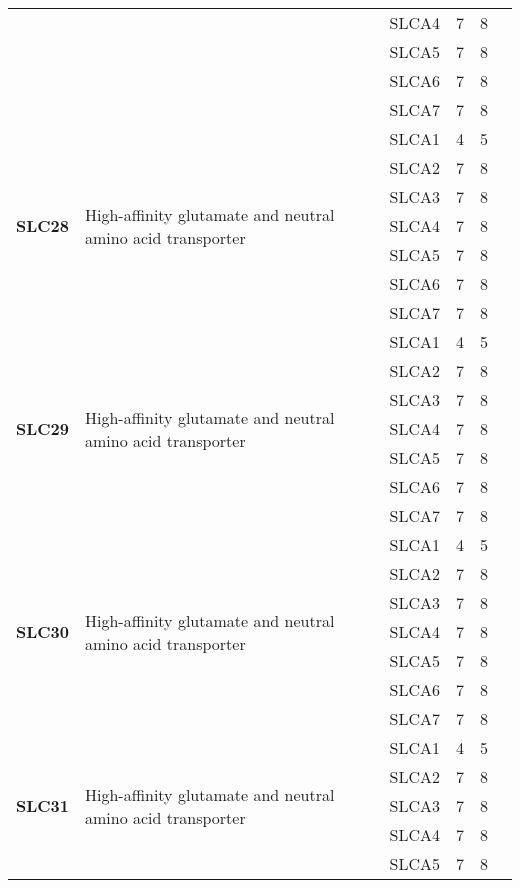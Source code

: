 \documentclass[12pt]{report}
\begin{document}
\begin{center}
\begin{longtable}{|p{1.5cm}|p{3.2cm}|p{1.9cm}|p{1.65cm}|p{3cm}|p{3cm}|}
\cline{3-6}
&&SLCA4&7 & 8&\\ 
\cline{3-6}
&&SLCA5&7 & 8&\\ 
\cline{3-6}
&&SLCA6&7 & 8&\\ 
\cline{3-6}
&&SLCA7&7 & 8&\\ 
\hline
\multirow{7}{1.5cm}{\textbf{SLC28}} & \multirow{7}{4cm}{High-affinity glutamate and neutral amino acid transporter} & SLCA1 & 4 & 5\\ 
\cline{3-6}
&&SLCA2&7 & 8&\\ 
\cline{3-6}
&&SLCA3&7 & 8&\\ 
\cline{3-6}
&&SLCA4&7 & 8&\\ 
\cline{3-6}
&&SLCA5&7 & 8&\\ 
\cline{3-6}
&&SLCA6&7 & 8&\\ 
\cline{3-6}
&&SLCA7&7 & 8&\\ 
\hline
\multirow{7}{1.5cm}{\textbf{SLC29}} & \multirow{7}{4cm}{High-affinity glutamate and neutral amino acid transporter} & SLCA1 & 4 & 5\\ 
\cline{3-6}
&&SLCA2&7 & 8&\\ 
\cline{3-6}
&&SLCA3&7 & 8&\\ 
\cline{3-6}
&&SLCA4&7 & 8&\\ 
\cline{3-6}
&&SLCA5&7 & 8&\\ 
\cline{3-6}
&&SLCA6&7 & 8&\\ 
\cline{3-6}
&&SLCA7&7 & 8&\\ 
\hline
\multirow{7}{1.5cm}{\textbf{SLC30}} & \multirow{7}{4cm}{High-affinity glutamate and neutral amino acid transporter} & SLCA1 & 4 & 5\\ 
\cline{3-6}
&&SLCA2&7 & 8&\\ 
\cline{3-6}
&&SLCA3&7 & 8&\\ 
\cline{3-6}
&&SLCA4&7 & 8&\\ 
\cline{3-6}
&&SLCA5&7 & 8&\\ 
\cline{3-6}
&&SLCA6&7 & 8&\\ 
\cline{3-6}
&&SLCA7&7 & 8&\\ 
\hline
\multirow{7}{1.5cm}{\textbf{SLC31}} & \multirow{7}{4cm}{High-affinity glutamate and neutral amino acid transporter} & SLCA1 & 4 & 5\\ 
\cline{3-6}
&&SLCA2&7 & 8&\\ 
\cline{3-6}
&&SLCA3&7 & 8&\\ 
\cline{3-6}
&&SLCA4&7 & 8&\\ 
\cline{3-6}
&&SLCA5&7 & 8&\\ 

\end{longtable}
\end{center}
\end{document}

